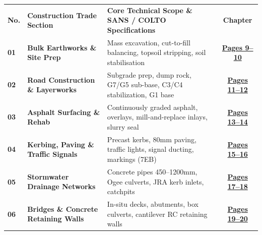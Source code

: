 \renewcommand{\arraystretch}{1.18}
\begin{tabularx}{\textwidth}{@{}l p{4.2cm} X c@{}}
\rowcolor{mhnavy}
{\color{white}\bfseries\fontsize{7.8pt}{9.2pt}\selectfont No.} & {\color{white}\bfseries\fontsize{7.8pt}{9.2pt}\selectfont Construction Trade Section} & {\color{white}\bfseries\fontsize{7.8pt}{9.2pt}\selectfont Core Technical Scope \& SANS / COLTO Specifications} & {\color{white}\bfseries\fontsize{7.8pt}{9.2pt}\selectfont Chapter} \\
\rowcolor{mhbluelight}
\fontsize{7.5pt}{9.0pt}\selectfont\bfseries 01 & \fontsize{7.5pt}{9.0pt}\selectfont\bfseries Bulk Earthworks \& Site Prep & \fontsize{7.5pt}{9.0pt}\selectfont Mass excavation, cut-to-fill balancing, topsoil stripping, soil stabilisation & \fontsize{7.5pt}{9.0pt}\selectfont\hyperlink{sec:earthworks}{\bfseries\color{mhblue}Pages 9--10} \\
\fontsize{7.5pt}{9.0pt}\selectfont\bfseries 02 & \fontsize{7.5pt}{9.0pt}\selectfont\bfseries Road Construction \& Layerworks & \fontsize{7.5pt}{9.0pt}\selectfont Subgrade prep, dump rock, G7/G5 sub-base, C3/C4 stabilization, G1 base & \fontsize{7.5pt}{9.0pt}\selectfont\hyperlink{sec:roads}{\bfseries\color{mhblue}Pages 11--12} \\
\rowcolor{mhbluelight}
\fontsize{7.5pt}{9.0pt}\selectfont\bfseries 03 & \fontsize{7.5pt}{9.0pt}\selectfont\bfseries Asphalt Surfacing \& Rehab & \fontsize{7.5pt}{9.0pt}\selectfont Continuously graded asphalt, overlays, mill-and-replace inlays, slurry seal & \fontsize{7.5pt}{9.0pt}\selectfont\hyperlink{sec:asphalt}{\bfseries\color{mhblue}Pages 13--14} \\
\fontsize{7.5pt}{9.0pt}\selectfont\bfseries 04 & \fontsize{7.5pt}{9.0pt}\selectfont\bfseries Kerbing, Paving \& Traffic Signals & \fontsize{7.5pt}{9.0pt}\selectfont Precast kerbs, 80mm paving, traffic lights, signal ducting, markings (7EB) & \fontsize{7.5pt}{9.0pt}\selectfont\hyperlink{sec:kerbing}{\bfseries\color{mhblue}Pages 15--16} \\
\rowcolor{mhbluelight}
\fontsize{7.5pt}{9.0pt}\selectfont\bfseries 05 & \fontsize{7.5pt}{9.0pt}\selectfont\bfseries Stormwater Drainage Networks & \fontsize{7.5pt}{9.0pt}\selectfont Concrete pipes 450--1200mm, Ogee culverts, JRA kerb inlets, catchpits & \fontsize{7.5pt}{9.0pt}\selectfont\hyperlink{sec:stormwater}{\bfseries\color{mhblue}Pages 17--18} \\
\fontsize{7.5pt}{9.0pt}\selectfont\bfseries 06 & \fontsize{7.5pt}{9.0pt}\selectfont\bfseries Bridges \& Concrete Retaining Walls & \fontsize{7.5pt}{9.0pt}\selectfont In-situ decks, abutments, box culverts, cantilever RC retaining walls & \fontsize{7.5pt}{9.0pt}\selectfont\hyperlink{sec:bridges}{\bfseries\color{mhblue}Pages 19--20} \\

\end{tabularx}

